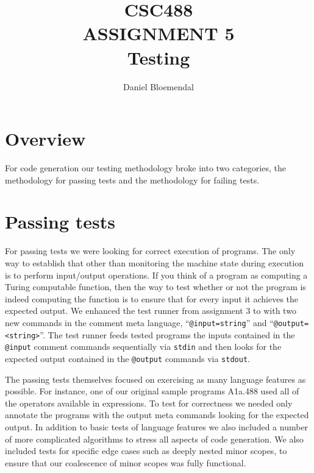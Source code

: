 \documentclass[oneside]{amsart}
\theoremstyle{definition}
\theoremstyle{remark}
\numberwithin{equation}{section}
\begin{document}
\title[CSC488 A5]{CSC488\\ASSIGNMENT 5\\Testing}
\author{Daniel Bloemendal}

\begin{titlepage}
\maketitle
\thispagestyle{empty}
\tableofcontents
\end{titlepage}

\section{Overview}
For code generation our testing methodology broke into two categories, the methodology for passing
tests and the methodology for failing tests.

\section{Passing tests}
For passing tests we were looking for correct execution of programs. The only way to establish that
other than monitoring the machine state during execution is to perform input/output operations. If
you think of a program as computing a Turing computable function, then the way to test whether or
not the program is indeed computing the function is to ensure that for every input it achieves the
expected output. We enhanced the test runner from assignment 3 to with two new commands in the
comment meta language, ``\texttt{@input=string}'' and ``\texttt{@output=<string>}''. The test runner
feeds tested programs the inputs contained in the \texttt{@input} comment commands sequentially via
\texttt{stdin} and then looks for the expected output contained in the \texttt{@output} commands via
\texttt{stdout}.

The passing tests themselves focused on exercising as many language features as possible. For
instance, one of our original sample programs A1a.488 used all of the operators available in
expressions. To test for correctness we needed only annotate the programs with the output meta
commands looking for the expected output. In addition to basic tests of language features we also
included a number of more complicated algorithms to stress all aspects of code generation. We also
included tests for specific edge cases such as deeply nested minor scopes, to ensure that our
coalescence of minor scopes was fully functional.
\end{document}

